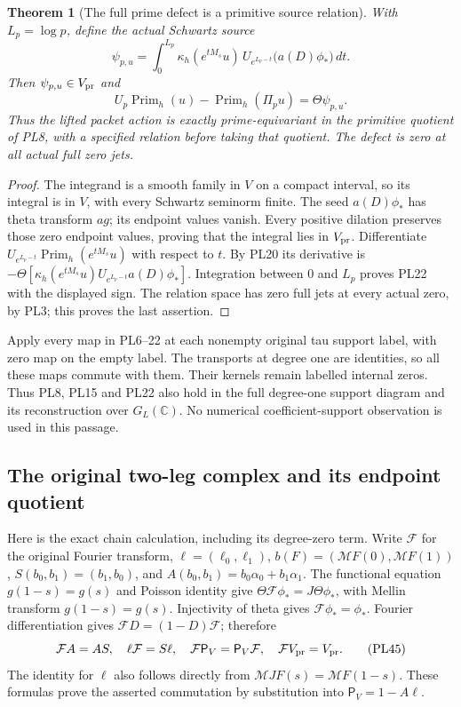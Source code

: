 \documentclass[11pt,a4paper]{article}
\newtheorem{theorem}{Theorem}[section]
\theoremstyle{definition}\newtheorem{definition}[theorem]{Definition}
\newcommand{\C}{\mathbb C}\newcommand{\R}{\mathbb R}
\begin{document}
\begin{theorem}[The full prime defect is a primitive source relation]
\label{pl:thm:prime}
With \(L_p=\log p\), define the actual Schwartz source
\[
 \psi_{p,u}=
 \int_0^{L_p}\kappa_h(e^{tM_s}u)\,
       U_{e^{L_p-t}}\bigl(a(D)\phi_*\bigr)\,dt.
 \tag{PL21}\label{pl:pl:duhamel}
\]
Then \(\psi_{p,u}\in V_{\rm pr}\) and
\[
 U_p\operatorname{Prim}_h(u)-\operatorname{Prim}_h(\Pi_pu)
                =\Theta\psi_{p,u}.
 \tag{PL22}\label{pl:pl:prime-defect}
\]
Thus the lifted packet action is exactly prime-equivariant in the
primitive quotient of PL8, with a specified relation before taking
that quotient. The defect is zero at all actual full zero jets.
\end{theorem}
\begin{proof}
The integrand is a smooth family in \(V\) on a compact interval,
so its integral is in \(V\), with every Schwartz seminorm finite.
The seed \(a(D)\phi_*\) has theta transform \(a g\); its endpoint
values vanish. Every positive dilation preserves those zero endpoint
values, proving that the integral lies in \(V_{\rm pr}\).
Differentiate
\(U_{e^{L_p-t}}\operatorname{Prim}_h(e^{tM_s}u)\)
with respect to \(t\). By PL20 its derivative is
\(-\Theta[\kappa_h(e^{tM_s}u)U_{e^{L_p-t}}a(D)\phi_*]\).
Integration between \(0\) and \(L_p\) proves PL22 with the
displayed sign. The relation space has zero full jets at every
actual zero, by PL3; this proves the last assertion.
\end{proof}

Apply every map in PL6--22 at each nonempty original tau support label,
with zero map on the empty label. The transports at degree one are
identities, so all these maps commute with them. Their kernels remain
labelled internal zeros. Thus PL8, PL15 and PL22 also hold in the full
degree-one support diagram and its reconstruction over \(G_L(\C)\).
No numerical coefficient-support observation is used in this passage.

\subsection{The original two-leg complex and its endpoint quotient}
Here is the exact chain calculation, including its degree-zero term.
Write \(\mathcal F\) for the original Fourier transform,
\(\ell=(\ell_0,\ell_1)\), \(b(F)=(\mathcal M F(0),\mathcal M F(1))\),
\(S(b_0,b_1)=(b_1,b_0)\), and
\(A(b_0,b_1)=b_0\alpha_0+b_1\alpha_1\).
The functional equation \(g(1-s)=g(s)\) and Poisson identity give
\(\Theta\mathcal F\phi_* =J\Theta\phi_*\), with Mellin transform
\(g(1-s)=g(s)\). Injectivity of theta gives
\(\mathcal F\phi_*=\phi_*\). Fourier differentiation gives
\(\mathcal F D=(1-D)\mathcal F\); therefore
\[
 \mathcal F A=AS,\quad \ell\mathcal F=S\ell,\quad
 \mathcal F\mathsf P_V=\mathsf P_V\mathcal F,\quad
 \mathcal F V_{\rm pr}=V_{\rm pr}.
 \tag{PL45}\label{pl:pl:Fourier-projection}
\]
The identity for \(\ell\) also follows directly from
\(\mathcal M JF(s)=\mathcal M F(1-s)\). These formulas prove the asserted
commutation by substitution into \(\mathsf P_V=1-A\ell\).
\end{document}
